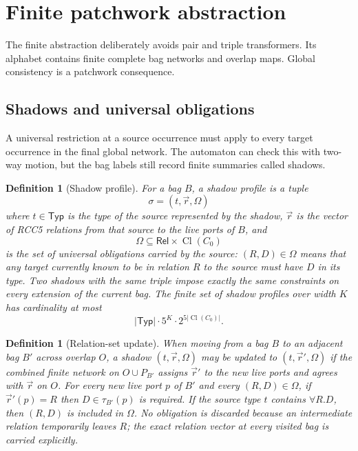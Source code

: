 \documentclass[11pt]{article}
\newtheorem{definition}[theorem]{Definition}
\newcommand{\Rel}{\mathsf{Rel}}
\newcommand{\Cl}{\operatorname{Cl}}
\begin{document}
\section{Finite patchwork abstraction}

The finite abstraction deliberately avoids pair and triple transformers.  Its alphabet
contains finite complete bag networks and overlap maps.  Global consistency is a patchwork
consequence.

\subsection{Shadows and universal obligations}

A universal restriction at a source occurrence must apply to every target occurrence in
the final global network.  The automaton can check this with two-way motion, but the bag
labels still record finite summaries called shadows.

\begin{definition}[Shadow profile]
For a bag $B$, a shadow profile is a tuple
\[
\sigma=(t,\vec r,\Omega)
\]
where $t\in\mathsf{Typ}$ is the type of the source represented by the shadow, $\vec r$ is
the vector of RCC5 relations from that source to the live ports of $B$, and
\[\Omega\subseteq \Rel\times\Cl(C_0)\]
is the set of universal obligations carried by the source: $(R,D)\in\Omega$ means that
any target currently known to be in relation $R$ to the source must have $D$ in its type.
Two shadows with the same triple impose exactly the same constraints on every extension
of the current bag.  The finite set of shadow profiles over width $K$ has cardinality at
most
\[
|\mathsf{Typ}|\cdot 5^K\cdot 2^{5|\Cl(C_0)|}.
\]
\end{definition}

\begin{definition}[Relation-set update]
When moving from a bag $B$ to an adjacent bag $B'$ across overlap $O$, a shadow
$(t,\vec r,\Omega)$ may be updated to $(t,\vec r',\Omega)$ if the combined finite network
on $O\cup P_{B'}$ assigns $\vec r'$ to the new live ports and agrees with $\vec r$ on
$O$.  For every new live port $p$ of $B'$ and every $(R,D)\in\Omega$, if $\vec r'(p)=R$
then $D\in\tau_{B'}(p)$ is required.  If the source type $t$ contains $\forall R.D$, then
$(R,D)$ is included in $\Omega$.  No obligation is discarded because an intermediate
relation temporarily leaves $R$; the exact relation vector at every visited bag is
carried explicitly.
\end{definition}
\end{document}
